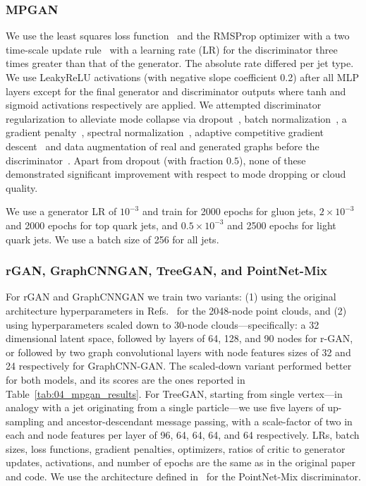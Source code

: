 \subsubsection{MPGAN}

We use the least squares loss function~\cite{mao_lsgan} and the RMSProp optimizer with a two time-scale update rule~\cite{TTUR} with a learning rate (LR) for the discriminator three times greater than that of the generator. The absolute rate differed per jet type.
We use LeakyReLU activations (with negative slope coefficient 0.2) after all MLP layers except for the final generator and discriminator outputs where tanh and sigmoid activations respectively are applied.
We attempted discriminator regularization to alleviate mode collapse via dropout~\cite{srivastava2014dropout}, batch normalization~\cite{ioffe2015batch}, a gradient penalty~\cite{wgangp}, spectral normalization~\cite{spectralnorm}, adaptive competitive gradient descent~\cite{acgd} and data augmentation of real and generated graphs before the discriminator~\cite{karras_2020, tran_2020, zhao_2020}.
Apart from dropout (with fraction $0.5$), none of these demonstrated significant improvement with respect to mode dropping or cloud quality.

We use a generator LR of $10^{-3}$ and train for 2000 epochs for gluon jets, $2\times10^{-3}$ and 2000 epochs for top quark jets, and $0.5\times10^{-3}$ and 2500 epochs for light quark jets.
We use a batch size of 256 for all jets.

\subsubsection{rGAN, GraphCNNGAN, TreeGAN, and PointNet-Mix}

For rGAN and GraphCNNGAN we train two variants: (1) using the original architecture hyperparameters in Refs.~\cite{rgan, graphcnngan} for the 2048-node point clouds, and (2) using hyperparameters scaled down to 30-node clouds---specifically: a 32 dimensional latent space, followed by layers of 64, 128, and 90 nodes for r-GAN, or followed by two graph convolutional layers with node features sizes of 32 and 24 respectively for GraphCNN-GAN.
The scaled-down variant performed better for both models, and its scores are the ones reported in Table~\ref{tab:04_mpgan_results}.
For TreeGAN, starting from single vertex---in analogy with a jet originating from a single particle---we use five layers of up-sampling and ancestor-descendant message passing, with a scale-factor of two in each and node features per layer of 96, 64, 64, 64, and 64 respectively.
LRs, batch sizes, loss functions, gradient penalties, optimizers, ratios of critic to generator updates, activations, and number of epochs are the same as in the original paper and code.
We use the architecture defined in~\cite{wang2020rethinking} for the PointNet-Mix discriminator.

